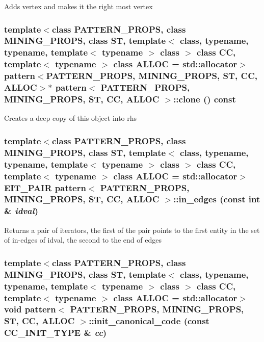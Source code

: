 Adds vertex and makes it the right most vertex 
\subsubsection{\setlength{\rightskip}{0pt plus 5cm}template$<$class PATTERN\_\-PROPS, class MINING\_\-PROPS, class ST, template$<$ class, typename, typename, template$<$ typename $>$ class $>$ class CC, template$<$ typename $>$ class ALLOC = std::allocator$>$ \bf{pattern}$<$PATTERN\_\-PROPS, MINING\_\-PROPS, ST, CC, ALLOC$>$$\ast$ \bf{pattern}$<$ PATTERN\_\-PROPS, MINING\_\-PROPS, ST, CC, ALLOC $>$::clone () const\hspace{0.3cm}{\tt  [inline]}}\label{classpattern_71d3931874255439f8467d3bb3ee2d40}


Creates a deep copy of this object into rhs 
\subsubsection{\setlength{\rightskip}{0pt plus 5cm}template$<$class PATTERN\_\-PROPS, class MINING\_\-PROPS, class ST, template$<$ class, typename, typename, template$<$ typename $>$ class $>$ class CC, template$<$ typename $>$ class ALLOC = std::allocator$>$ EIT\_\-PAIR \bf{pattern}$<$ PATTERN\_\-PROPS, MINING\_\-PROPS, ST, CC, ALLOC $>$::in\_\-edges (const int \& {\em idval})\hspace{0.3cm}{\tt  [inline]}}\label{classpattern_0493e9235ac66ab55141ad28a5884e11}


Returns a pair of iterators, the first of the pair points to the first entity in the set of in-edges of idval, the second to the end of edges 
\subsubsection{\setlength{\rightskip}{0pt plus 5cm}template$<$class PATTERN\_\-PROPS, class MINING\_\-PROPS, class ST, template$<$ class, typename, typename, template$<$ typename $>$ class $>$ class CC, template$<$ typename $>$ class ALLOC = std::allocator$>$ void \bf{pattern}$<$ PATTERN\_\-PROPS, MINING\_\-PROPS, ST, CC, ALLOC $>$::init\_\-canonical\_\-code (const CC\_\-INIT\_\-TYPE \& {\em cc})\hspace{0.3cm}{\tt  [inline]}}\label{classpattern_b7c9f6193c9eccef49f6ce8fcc837661}


